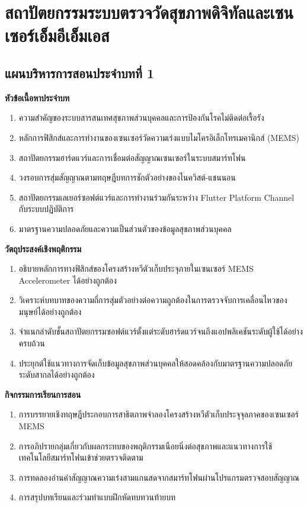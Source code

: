 \chapter{สถาปัตยกรรมระบบตรวจวัดสุขภาพดิจิทัลและเซนเซอร์เอ็มอีเอ็มเอส}
\label{chap:ch01}

\section*{แผนบริหารการสอนประจำบทที่ 1}

\noindent\textbf{หัวข้อเนื้อหาประจำบท}
\begin{enumerate}
    \item ความสำคัญของระบบสารสนเทศสุขภาพส่วนบุคคลและการป้องกันโรคไม่ติดต่อเรื้อรัง
    \item หลักการฟิสิกส์และการทำงานของเซนเซอร์วัดความเร่งแบบไมโครอิเล็กโทรเมคานิกส์ (MEMS)
    \item สถาปัตยกรรมฮาร์ดแวร์และการเชื่อมต่อสัญญาณเซนเซอร์ในระบบสมาร์ทโฟน
    \item วงรอบการสุ่มสัญญาณตามทฤษฎีบทการชักตัวอย่างของไนควิสต์-แชนนอน
    \item สถาปัตยกรรมเลเยอร์ซอฟต์แวร์และการทำงานร่วมกันระหว่าง Flutter Platform Channel กับระบบปฏิบัติการ
    \item มาตรฐานความปลอดภัยและความเป็นส่วนตัวของข้อมูลสุขภาพส่วนบุคคล
\end{enumerate}

\noindent\textbf{วัตถุประสงค์เชิงพฤติกรรม}
\begin{enumerate}
    \item อธิบายหลักการทางฟิสิกส์ของโครงสร้างหวีตัวเก็บประจุภายในเซนเซอร์ MEMS Accelerometer ได้อย่างถูกต้อง
    \item วิเคราะห์บทบาทของความถี่การสุ่มตัวอย่างต่อความถูกต้องในการตรวจจับการเคลื่อนไหวของมนุษย์ได้อย่างถูกต้อง
    \item จำแนกลำดับชั้นสถาปัตยกรรมซอฟต์แวร์ตั้งแต่ระดับฮาร์ดแวร์จนถึงแอปพลิเคชันระดับผู้ใช้ได้อย่างครบถ้วน
    \item ประยุกต์ใช้แนวทางการจัดเก็บข้อมูลสุขภาพส่วนบุคคลให้สอดคล้องกับมาตรฐานความปลอดภัยระดับสากลได้อย่างถูกต้อง
\end{enumerate}

\noindent\textbf{กิจกรรมการเรียนการสอน}
\begin{enumerate}
    \item การบรรยายเชิงทฤษฎีประกอบการสาธิตภาพจำลองโครงสร้างหวีตัวเก็บประจุจุลภาคของเซนเซอร์ MEMS
    \item การอภิปรายกลุ่มเกี่ยวกับผลกระทบของพฤติกรรมเนือยนิ่งต่อสุขภาพและแนวทางการใช้เทคโนโลยีสมาร์ทโฟนเข้าช่วยตรวจติดตาม
    \item การทดลองอ่านค่าสัญญาณความเร่งสามแกนสดจากสมาร์ทโฟนผ่านโปรแกรมตรวจสอบสัญญาณ
    \item การสรุปบทเรียนและร่วมทำแบบฝึกหัดทบทวนท้ายบท
\end{enumerate}

